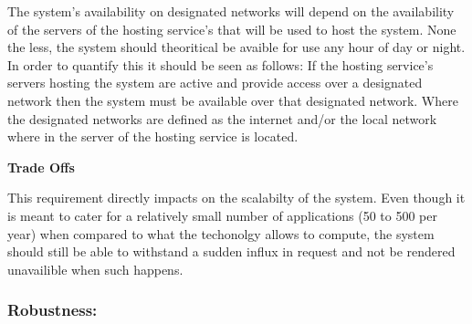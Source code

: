 \begin{flushleft}

The system's availability on designated networks will depend on the availability of the servers of the hosting service's that will be used to host the system. None the less, the system should theoritical be avaible for use any hour of day or night.\\
In order to quantify this it should be seen as follows: If the hosting service's servers hosting the system are active and provide access over a designated network then the system must be available over that designated network. Where the designated networks are defined as the internet and/or the local network where in the server of the hosting service is located.
\vspace{0.1in}

\textbf{Trade Offs}

This requirement directly impacts on the scalabilty of the system. Even though it is meant to cater for a relatively small number of applications (50 to 500 per year) when compared to what the techonolgy allows to compute, the system should still be able to withstand a sudden influx in request and not be rendered unavailible when such happens.

\vspace{0.1in}
\end{flushleft}
\newpage
\subsubsection{Robustness:}

